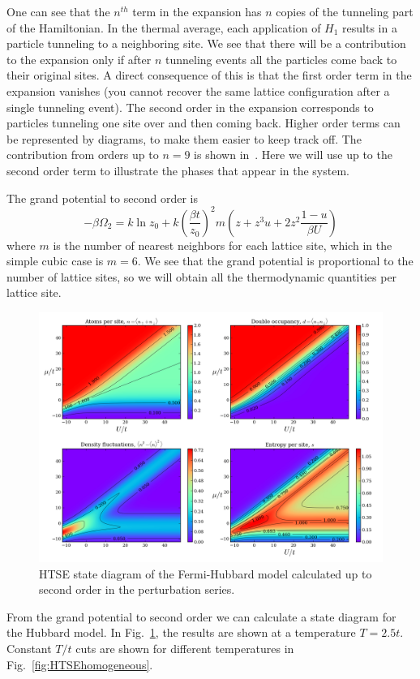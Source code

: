 One can see that the $n^{th}$ term in the expansion has $n$ copies of the
tunneling part of the Hamiltonian.  In the thermal average, each  application
of $H_{1}$ results in a particle tunneling to a neighboring site. We see that
there will be a contribution to the expansion only if after $n$ tunneling
events all the particles come back to their original sites.  A direct
consequence of this is that the first order term in the expansion vanishes (you
cannot recover the same lattice configuration after a single tunneling event).
The second order in the expansion corresponds to particles tunneling one site
over and then coming back.  Higher order terms can be represented by diagrams,
to make them easier to keep track off.  The contribution from orders up to
$n=9$ is shown in~\cite{Henderson1992}.  Here we will use up to the second
order term to illustrate the phases that appear in the system.  

The grand potential to second order is~\cite{Henderson1992,Jordens2010} 
\begin{equation}
-\beta \Omega_{2} = k \ln z_{0} + k \left( \frac{\beta t }{z_{0}} \right)^{2} m 
        \left( z + z^{3} u + 2z^{2} \frac{1-u}{\beta U} \right) 
\end{equation} 
where $m$ is the number of nearest neighbors for each lattice site, which in
the simple cubic case is $m=6$.  We see that the grand potential is
proportional to the number of lattice sites, so we will obtain all the
thermodynamic quantities per lattice site. 

\begin{figure}
\centering
\includegraphics[width=\textwidth]{../figures/HubbardPhaseDiagram_figures/HTSE_phasesT025.png}
\caption[HTSE state diagram of the Fermi-Hubbard model]{\small HTSE state
diagram of the Fermi-Hubbard model calculated up to second order in the
perturbation series.  } \label{fig:highTphases}
\end{figure}
From the grand potential to second order we can calculate a state diagram for
the Hubbard model.  In Fig.~\ref{fig:highTphases}, the results are shown at a
temperature $T=2.5t$. Constant $T/t$ cuts are shown for different temperatures
in Fig.~\ref{fig:HTSEhomogeneous}.  

